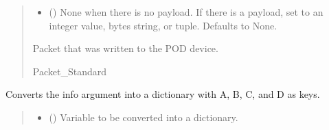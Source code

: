 \documentclass[letterpaper,10pt,english]{sphinxmanual}
\begin{document}
\begin{fulllineitems}
\begin{fulllineitems}
\begin{quote}
\begin{description}
\begin{itemize}
\item {} 
\sphinxAtStartPar
{} (\sphinxstyleliteralemphasis{\sphinxupquote{ | }}\sphinxstyleliteralemphasis{\sphinxupquote{ | }}\sphinxstyleliteralemphasis{\sphinxupquote{{[}}}\sphinxstyleliteralemphasis{\sphinxupquote{ | }}\sphinxstyleliteralemphasis{\sphinxupquote{{]}}}\sphinxstyleliteralemphasis{\sphinxupquote{, }}) \textendash{} None when there is no payload. If there                 is a payload, set to an integer value, bytes string, or tuple. Defaults to None.

\end{itemize}

\sphinxAtStartPar
Packet that was written to the POD device.

\sphinxAtStartPar
Packet\_Standard

\end{description}\end{quote}

\end{fulllineitems}


\begin{fulllineitems}
\label{\detokenize{PodApi.Devices:PodApi.Devices.PodDevice_8401HR.Pod8401HR._FixABCDtype}}
\pysigstartsignatures
{}
\pysigstopsignatures
\sphinxAtStartPar
Converts the info argument into a dictionary with A, B, C, and D as keys.
\begin{quote}\begin{description}
\begin{itemize}
\item {} 
\sphinxAtStartPar
{} (\sphinxstyleliteralemphasis{\sphinxupquote{ | }}\sphinxstyleliteralemphasis{\sphinxupquote{ | }}) \textendash{} Variable to be converted into a dictionary.


\end{itemize}
\end{description}
\end{quote}
\end{fulllineitems}
\end{fulllineitems}
\end{document}
